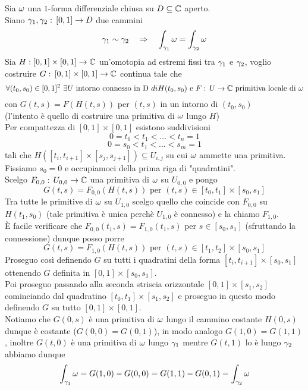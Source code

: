 \begin{thm}\bianco 
Sia $\omega$ una $1$-forma differenziale chiusa su $D\subseteq \mathbb{C}$ aperto.\\
Siano $\gamma_1,\gamma_2:\, [0,1]\to D$ due cammini 
$$\gamma_1 \sim \gamma_2 \quad \Rightarrow \quad \int_{\gamma_1}\omega = \int_{\gamma_2}\omega$$
\proof Sia $H:[0,1]\times [0,1]\to \mathbb{C}$ un'omotopia ad estremi fissi tra $\gamma_1$ e $\gamma_2$, voglio costruire $G:\, [0,1]\times[0,1]\to \mathbb{C}$ continua tale che
$$\forall (t_0,s_0) \in [0,1]^2 \, \, \exists U \text{ intorno connesso in D } di H(t_0,s_0) \text{ e } F:\, U \to \mathbb{C} \text{ primitiva locale di }  \omega $$
con $ G(t,s) =F(H(t,s))$ per $(t,s)$ in un intorno di $(t_0,s_0)$ \\
(l'intento \`e quello di costruire una primitiva di $\omega$ lungo $H$)\\
Per compattezza di $[0,1]\times [0,1]$ esistono suddivisioni 
$$0=t_0< t_1< \dots < t_n =1 $$
$$0=s_0< t_1< \dots < s_m =1 $$
tali che $H([t_i,t_{i+1}]\times[s_j,s_{j+1}])\subseteq U_{i,j}$ su cui $\omega$ ammette una primitiva.\\
Fissiamo $s_0=0$ e  occupiamoci della prima riga di "quadratini".\\
Scelgo $F_{0,0}:\, U_{0,0}\to \mathbb{C}$ una primitiva di $\omega$ su $U_{0,0}$ e pongo 
$$G(t,s)=F_{0,0}(H(t,s)) \text{ per } (t,s)\in [t_0,t_1]\times [s_0,s_1]$$
Tra tutte le primitive di $\omega$ su $U_{1,0}$ scelgo quello che coincide con $F_{0,0}$ su $H(t_1,s_0)$ (tale primitiva \`e unica perch\`e $U_{1,0}$ \`e connesso) e la chiamo $F_{1,0}$.\\
\`E facile verificare che $F_{0,0}(t_1,s) = F_{1,0}(t_1,s)$ per $s\in [s_0,s_1]$ (sfruttando la connessione) dunque posso porre
$$G(t,s) = F_{1,0}(H(t,s)) \text{ per } (t,s)\in [ t_1, t_2]\times[s_0,s_1]$$
Proseguo cos\`i definendo $G$ su tutti i quadratini della forma $[t_i,t_{i+1}]\times [s_0,s_1]$ ottenendo $G$ definita in $[0,1]\times[s_0,s_1]$.\\
Poi proseguo passando alla seconda striscia orizzontale $[0,1]\times [s_1,s_2]$ cominciando dal quadratino $[t_0,t_1]\times [s_1,s_2]$ e proseguo in questo modo definendo $G$ su tutto $[0,1]\times [0,1]$.\\
Notiamo che $G(0,s)$ \`e una primitiva di $\omega$ lungo il cammino costante $H(0,s)$ dunque \`e costante ($G(0,0)=G(0,1)$), in modo analogo $G(1,0)=G(1,1)$, inoltre $G(t,0)$ \`e una primitiva di $\omega$ lungo $\gamma_1 $ mentre $G(t,1)$ lo \`e lungo $\gamma_2$ abbiamo dunque 
$$\int_{\gamma_1} \omega = G(1,0)-G(0,0) = G(1,1)-G(0,1)=\int_{\gamma_2}\omega$$
\endproof
\end{thm}
